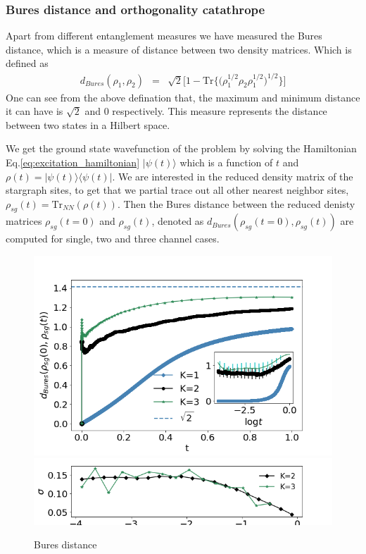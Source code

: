 \documentclass[reprint,prb,superscriptaddress]{revtex4-2}
\begin{document}
\subsubsection{Bures distance and orthogonality catathrope}
\noindent Apart from different entanglement measures we have measured the Bures distance, which is a measure of distance between two density matrices. Which is defined as 
\begin{eqnarray}
d_{Bures}(\rho_1,\rho_2) &=& \sqrt{2} \bigg[1- \textrm{Tr}\bigg\{ \bigg(\rho_1^{1/2}  \rho_2 \rho_{1}^{1/2}\bigg)^{1/2} \bigg\}\bigg]
\end{eqnarray}
One can see from the above defination that, the maximum and minimum distance it can have is $\sqrt{2}$ and $0$ respectively. This measure represents the distance between two states in a Hilbert space. 
\par We get the ground state wavefunction of the problem by solving the Hamiltonian Eq.\eqref{eq:excitation_hamiltonian} $|\psi(t)\rangle$ which is a function of $t$ and $\rho(t)= |\psi(t)\rangle \langle \psi(t)|$. We are interested in the reduced density matrix of the stargraph sites, to get that we partial trace out all other nearest neighbor sites, $\rho_{sg}(t)=\textrm{Tr}_{NN}(\rho(t))$. Then the Bures distance between the reduced denisty matrices $\rho_{sg}(t=0)$ and $\rho_{sg}(t)$, denoted as $d_{Bures}(\rho_{sg}(t=0),\rho_{sg}(t))$ are computed for single, two and three channel cases.
\begin{figure}[!htpb]
\includegraphics[scale=0.4]{plt/error_Bures_Distance_Ch123_10001}
\includegraphics[scale=0.4]{plt/errorbar_Bures_Distance_Ch123_10001}
\caption{Bures distance}
\label{fig:bures_distance}
\end{figure}
\end{document}
